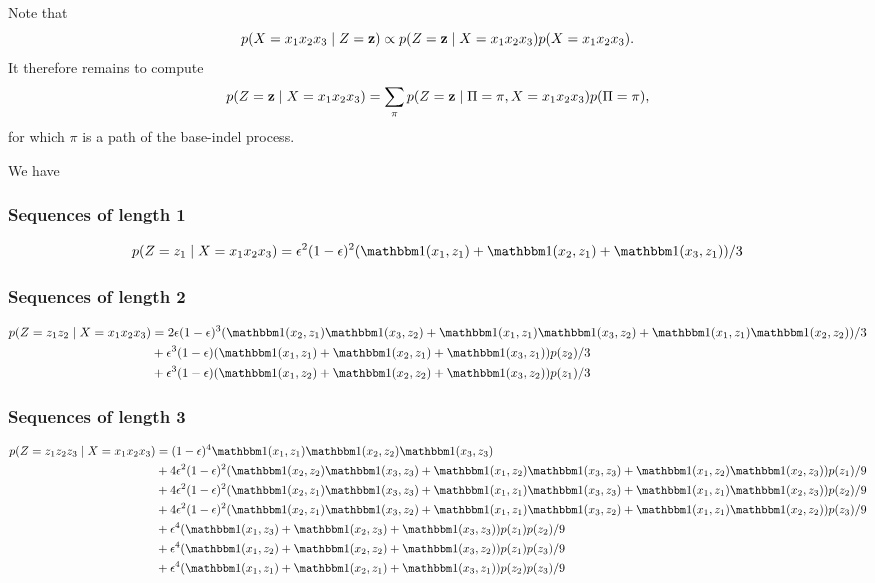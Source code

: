 Note that
\begin{equation*}
  p(X=x_1x_2x_3 \;|\; Z=\mathbf{z}) \propto p(Z=\mathbf{z} \;|\; X=x_1x_2x_3) p(X=x_1x_2x_3).
\end{equation*}
It therefore remains to compute
\begin{equation*}
  p(Z=\mathbf{z} \;|\; X=x_1x_2x_3) = \sum_{\pi}p(Z=\mathbf{z} \;|\; \Pi=\pi, X=x_1x_2x_3) p(\Pi=\pi),
\end{equation*}
for which $\pi$ is a path of the base-indel process.

We have

\subsubsection{Sequences of length 1}

\begin{equation*}
  p(Z=z_1 \gv X=x_1x_2x_3) = \e^2(1-\e)^2(\I(x_1, z_1) + \I(x_2, z_1) + \I(x_3, z_1))/3
\end{equation*}

\subsubsection{Sequences of length 2}

\begin{equation*}
  \begin{split}
    p(Z=z_1z_2 \gv X=x_1x_2x_3)
        &= 2\e(1-\e)^3(\I(x_2, z_1)\I(x_3, z_2) + \I(x_1, z_1)\I(x_3, z_2) + \I(x_1, z_1)\I(x_2, z_2))/3\\
        &+ \e^3(1-\e)(\I(x_1, z_1) + \I(x_2, z_1) + \I(x_3, z_1))p(z_2)/3\\
        &+ \e^3(1-\e)(\I(x_1, z_2) + \I(x_2, z_2) + \I(x_3, z_2))p(z_1)/3
  \end{split}
\end{equation*}

\subsubsection{Sequences of length 3}

\begin{equation*}
  \begin{split}
    p(Z=z_1z_2z_3 \gv X=x_1x_2x_3) &= (1-\e)^4\I(x_1, z_1)\I(x_2, z_2)\I(x_3, z_3)\\
        &+ 4\e^2(1-\e)^2 (\I(x_2, z_2)\I(x_3, z_3) + \I(x_1, z_2)\I(x_3, z_ 3) + \I(x_1, z_2)\I(x_2, z_3)) p(z_1)/9\\
        &+ 4\e^2(1-\e)^2 (\I(x_2, z_1)\I(x_3, z_3) + \I(x_1, z_1)\I(x_3, z_3) + \I(x_1, z_1)\I(x_2, z_3))p(z_2)/9\\
        &+ 4\e^2(1-\e)^2 (\I(x_2, z_1)\I(x_3, z_2) + \I(x_1, z_1)\I(x_3, z_2) + \I(x_1, z_1)\I(x_2, z_2))p(z_3)/9\\
        &+ \e^4 (\I(x_1, z_3) + \I(x_2, z_3) + \I(x_3, z_3))p(z_1)p(z_2)/9\\
        &+ \e^4 (\I(x_1, z_2) + \I(x_2, z_2) + \I(x_3, z_2))p(z_1)p(z_3)/9\\
        &+ \e^4 (\I(x_1, z_1) + \I(x_2, z_1) + \I(x_3, z_1))p(z_2)p(z_3)/9
  \end{split}
\end{equation*}

